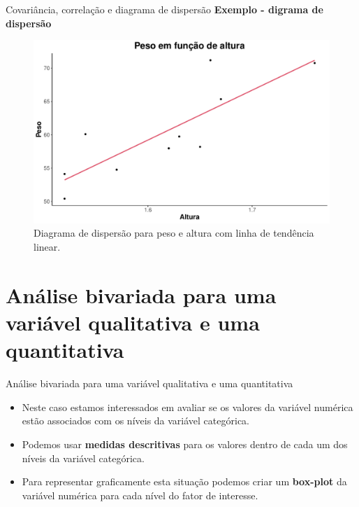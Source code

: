 \documentclass[
  ignorenonframetext,
  serif,
  professionalfont,
  usenames,
  dvipsnames,
  aspectratio = 169]{beamer}
\begin{document}
\begin{frame}{Covariância, correlação e diagrama de dispersão}
\label{covariuxe2ncia-correlauxe7uxe3o-e-diagrama-de-dispersuxe3o-3}
\textbf{Exemplo - digrama de dispersão}

\begin{figure}

{\centering \includegraphics[width=0.65\linewidth]{encontro2_files/figure-beamer/unnamed-chunk-35-1} 

}

\caption{Diagrama de dispersão para peso e altura com linha de tendência linear.}\label{fig:unnamed-chunk-35}
\end{figure}
\end{frame}

\section{Análise bivariada para uma variável qualitativa e uma
quantitativa}\label{anuxe1lise-bivariada-para-uma-variuxe1vel-qualitativa-e-uma-quantitativa}

\begin{frame}{Análise bivariada para uma variável qualitativa e uma
quantitativa}
\label{anuxe1lise-bivariada-para-uma-variuxe1vel-qualitativa-e-uma-quantitativa-1}
\begin{itemize}
\item
  Neste caso estamos interessados em avaliar se os valores da variável
  numérica estão associados com os níveis da variável categórica.
\item
  Podemos usar \textbf{medidas descritivas} para os valores dentro de
  cada um dos níveis da variável categórica.
\item
  Para representar graficamente esta situação podemos criar um
  \textbf{box-plot} da variável numérica para cada nível do fator de
  interesse.
\end{itemize}
\end{frame}
\end{document}
